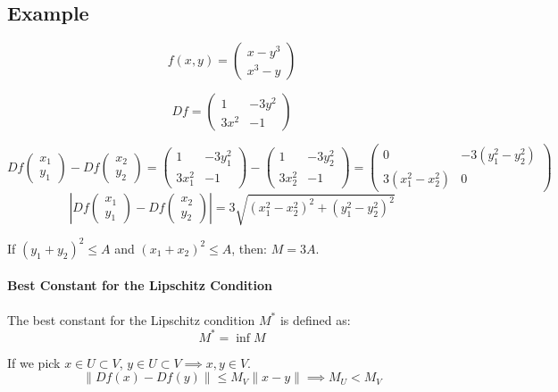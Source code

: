 \documentclass[11pt]{article}
\begin{document}
\subsection*{Example}
\[
f(x,y) = \begin{pmatrix}
    x - y^3 \\
    x^3 - y
\end{pmatrix}
\]

\[
Df = \begin{pmatrix}
    1 & -3y^2 \\
    3x^2 & -1
\end{pmatrix}
\]

\[
Df \begin{pmatrix}
    x_1 \\
    y_1
\end{pmatrix} - Df \begin{pmatrix}
    x_2 \\
    y_2
\end{pmatrix} = \begin{pmatrix}
    1 & -3y_1^2 \\
    3x_1^2 & -1
\end{pmatrix} - \begin{pmatrix}
    1 & -3y_2^2 \\
    3x_2^2 & -1
\end{pmatrix} = \begin{pmatrix}
    0 & -3(y_1^2 - y_2^2) \\
    3(x_1^2 - x_2^2) & 0
\end{pmatrix}
\]
\[
\left|Df \begin{pmatrix}
    x_1 \\
    y_1
\end{pmatrix} - Df \begin{pmatrix}
    x_2 \\
    y_2
\end{pmatrix}\right| = 3 \sqrt{(x_1^2 - x_2^2)^2 + (y_1^2 - y_2^2)^2}
\]

If $(y_1 + y_2)^2 \leq A$ and $(x_1 + x_2)^2 \leq A$, then: $M = 3A$.

\paragraph{Best Constant for the Lipschitz Condition}
The best constant for the Lipschitz condition $M^*$ is defined as:
\[
M^* = \inf M
\]

If we pick $x \in U \subset V$, $y \in U \subset V \implies x,y \in V$.
\[
\| Df(x) - Df(y) \| \leq M_V \| x - y \| \implies M_U < M_V
\]
\end{document}
